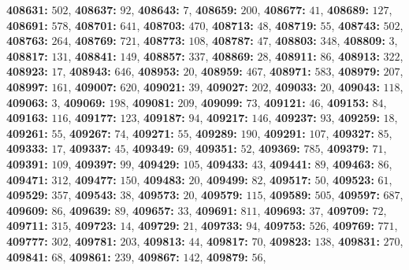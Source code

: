 \textsf{\bfseries 408631:} $502$, \textsf{\bfseries 408637:} $92$, \textsf{\bfseries 408643:} $7$, \textsf{\bfseries 408659:} $200$, \textsf{\bfseries 408677:} $41$, \textsf{\bfseries 408689:} $127$, \textsf{\bfseries 408691:} $578$, \textsf{\bfseries 408701:} $641$, \textsf{\bfseries 408703:} $470$, \textsf{\bfseries 408713:} $48$, \textsf{\bfseries 408719:} $55$, \textsf{\bfseries 408743:} $502$, \textsf{\bfseries 408763:} $264$, \textsf{\bfseries 408769:} $721$, \textsf{\bfseries 408773:} $108$, \textsf{\bfseries 408787:} $47$, \textsf{\bfseries 408803:} $348$, \textsf{\bfseries 408809:} $3$, \textsf{\bfseries 408817:} $131$, \textsf{\bfseries 408841:} $149$, \textsf{\bfseries 408857:} $337$, \textsf{\bfseries 408869:} $28$, \textsf{\bfseries 408911:} $86$, \textsf{\bfseries 408913:} $322$, \textsf{\bfseries 408923:} $17$, \textsf{\bfseries 408943:} $646$, \textsf{\bfseries 408953:} $20$, \textsf{\bfseries 408959:} $467$, \textsf{\bfseries 408971:} $583$, \textsf{\bfseries 408979:} $207$, \textsf{\bfseries 408997:} $161$, \textsf{\bfseries 409007:} $620$, \textsf{\bfseries 409021:} $39$, \textsf{\bfseries 409027:} $202$, \textsf{\bfseries 409033:} $20$, \textsf{\bfseries 409043:} $118$, \textsf{\bfseries 409063:} $3$, \textsf{\bfseries 409069:} $198$, \textsf{\bfseries 409081:} $209$, \textsf{\bfseries 409099:} $73$, \textsf{\bfseries 409121:} $46$, \textsf{\bfseries 409153:} $84$, \textsf{\bfseries 409163:} $116$, \textsf{\bfseries 409177:} $123$, \textsf{\bfseries 409187:} $94$, \textsf{\bfseries 409217:} $146$, \textsf{\bfseries 409237:} $93$, \textsf{\bfseries 409259:} $18$, \textsf{\bfseries 409261:} $55$, \textsf{\bfseries 409267:} $74$, \textsf{\bfseries 409271:} $55$, \textsf{\bfseries 409289:} $190$, \textsf{\bfseries 409291:} $107$, \textsf{\bfseries 409327:} $85$, \textsf{\bfseries 409333:} $17$, \textsf{\bfseries 409337:} $45$, \textsf{\bfseries 409349:} $69$, \textsf{\bfseries 409351:} $52$, \textsf{\bfseries 409369:} $785$, \textsf{\bfseries 409379:} $71$, \textsf{\bfseries 409391:} $109$, \textsf{\bfseries 409397:} $99$, \textsf{\bfseries 409429:} $105$, \textsf{\bfseries 409433:} $43$, \textsf{\bfseries 409441:} $89$, \textsf{\bfseries 409463:} $86$, \textsf{\bfseries 409471:} $312$, \textsf{\bfseries 409477:} $150$, \textsf{\bfseries 409483:} $20$, \textsf{\bfseries 409499:} $82$, \textsf{\bfseries 409517:} $50$, \textsf{\bfseries 409523:} $61$, \textsf{\bfseries 409529:} $357$, \textsf{\bfseries 409543:} $38$, \textsf{\bfseries 409573:} $20$, \textsf{\bfseries 409579:} $115$, \textsf{\bfseries 409589:} $505$, \textsf{\bfseries 409597:} $687$, \textsf{\bfseries 409609:} $86$, \textsf{\bfseries 409639:} $89$, \textsf{\bfseries 409657:} $33$, \textsf{\bfseries 409691:} $811$, \textsf{\bfseries 409693:} $37$, \textsf{\bfseries 409709:} $72$, \textsf{\bfseries 409711:} $315$, \textsf{\bfseries 409723:} $14$, \textsf{\bfseries 409729:} $21$, \textsf{\bfseries 409733:} $94$, \textsf{\bfseries 409753:} $526$, \textsf{\bfseries 409769:} $771$, \textsf{\bfseries 409777:} $302$, \textsf{\bfseries 409781:} $203$, \textsf{\bfseries 409813:} $44$, \textsf{\bfseries 409817:} $70$, \textsf{\bfseries 409823:} $138$, \textsf{\bfseries 409831:} $270$, \textsf{\bfseries 409841:} $68$, \textsf{\bfseries 409861:} $239$, \textsf{\bfseries 409867:} $142$, \textsf{\bfseries 409879:} $56$, 
